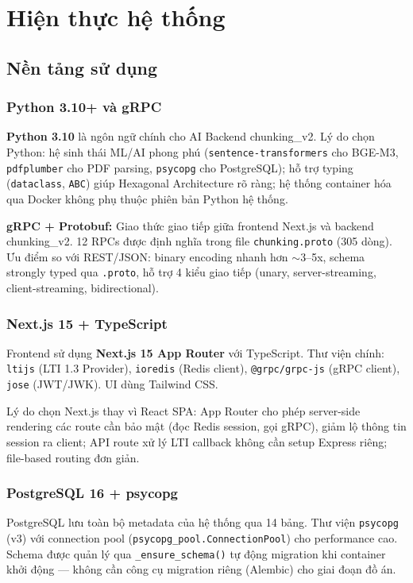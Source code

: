 \section{Hiện thực hệ thống}

\subsection{Nền tảng sử dụng}

\subsubsection{Python 3.10+ và gRPC}

\textbf{Python 3.10} là ngôn ngữ chính cho AI Backend chunking\_v2.
Lý do chọn Python: hệ sinh thái ML/AI phong phú
(\texttt{sentence-transformers} cho BGE-M3, \texttt{pdfplumber} cho
PDF parsing, \texttt{psycopg} cho PostgreSQL); hỗ trợ typing
(\texttt{dataclass}, \texttt{ABC}) giúp Hexagonal Architecture rõ ràng;
hệ thống container hóa qua Docker không phụ thuộc phiên bản Python hệ
thống.

\textbf{gRPC + Protobuf:} Giao thức giao tiếp giữa frontend Next.js
và backend chunking\_v2. 12 RPCs được định nghĩa trong file
\texttt{chunking.proto} (305 dòng). Ưu điểm so với REST/JSON:
binary encoding nhanh hơn $\sim$3--5x, schema strongly typed qua
\texttt{.proto}, hỗ trợ 4 kiểu giao tiếp (unary, server-streaming,
client-streaming, bidirectional).

\subsubsection{Next.js 15 + TypeScript}

Frontend sử dụng \textbf{Next.js 15 App Router} với TypeScript.
Thư viện chính: \texttt{ltijs} (LTI 1.3 Provider), \texttt{ioredis}
(Redis client), \texttt{@grpc/grpc-js} (gRPC client), \texttt{jose}
(JWT/JWK). UI dùng Tailwind CSS.

Lý do chọn Next.js thay vì React SPA: App Router cho phép server-side
rendering các route cần bảo mật (đọc Redis session, gọi gRPC), giảm
lộ thông tin session ra client; API route xử lý LTI callback không
cần setup Express riêng; file-based routing đơn giản.

\subsubsection{PostgreSQL 16 + psycopg}

PostgreSQL lưu toàn bộ metadata của hệ thống qua 14 bảng. Thư viện
\texttt{psycopg} (v3) với connection pool
(\texttt{psycopg\_pool.ConnectionPool}) cho performance cao.
Schema được quản lý qua \texttt{\_ensure\_schema()} tự động migration
khi container khởi động --- không cần công cụ migration riêng (Alembic)
cho giai đoạn đồ án.

